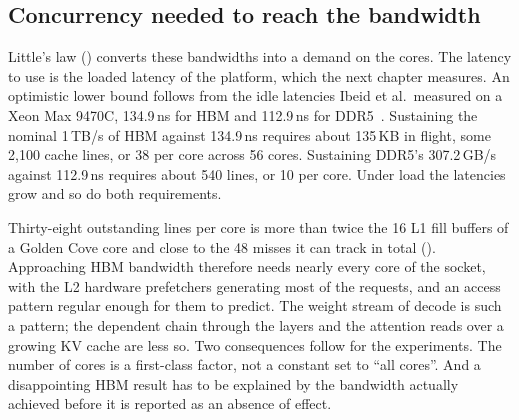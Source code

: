 \subsection{Concurrency needed to reach the bandwidth}
\label{sec:platform-concurrency}

Little's law () converts these bandwidths into a
demand on the cores.  The latency to use is the loaded latency of the
platform, which the next chapter measures.  An optimistic lower bound
follows from the idle latencies Ibeid et al.\ measured on a Xeon Max
9470C, 134.9\,ns for HBM and 112.9\,ns for DDR5~\cite{ibeid2025aurora}.
Sustaining the nominal 1\,TB/s of HBM against 134.9\,ns requires about
135\,KB in flight, some 2{,}100 cache lines, or 38 per core across 56
cores.  Sustaining DDR5's 307.2\,GB/s against 112.9\,ns requires about
540 lines, or 10 per core.  Under load the latencies grow and so do both
requirements.

Thirty-eight outstanding lines per core is more than twice the 16 L1 fill
buffers of a Golden Cove core and close to the 48 misses it can track in
total ().  Approaching HBM bandwidth therefore
needs nearly every core of the socket, with the L2 hardware prefetchers
generating most of the requests, and an access pattern regular enough for
them to predict.  The weight stream of decode is such a pattern; the
dependent chain through the layers and the attention reads over a
growing KV cache are less so.  Two consequences follow for the
experiments.  The number of cores is a first-class factor, not a
constant set to ``all cores''.  And a disappointing HBM result has to be
explained by the bandwidth actually achieved before it is reported as an
absence of effect.

